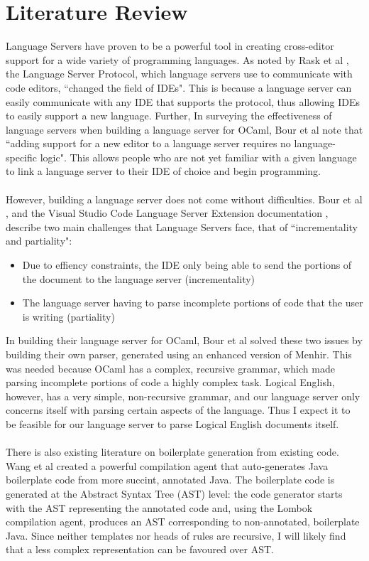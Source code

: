 \documentclass[../main.tex]{subfiles}
\begin{document}
\chapter{Literature Review}
Language Servers have proven to be a powerful tool in creating cross-editor support for a wide variety of programming languages. As noted by Rask et al \cite[]{standardised_lsp_extensions}, the Language Server Protocol, which language servers use to communicate with code editors, ``changed the field of IDEs". This is because a language server can easily communicate with any IDE that supports the protocol, thus allowing IDEs to easily support a new language. Further, In surveying the effectiveness of language servers when building a language server for OCaml, Bour et al \cite[]{merlin_experience_report} note that ``adding support for a new editor to a language server requires no language-specific logic". This allows people who are not yet familiar with a given language to link a language server to their IDE of choice and begin programming. 
\\ \\
However, building a language server does not come without difficulties. Bour et al \cite[]{merlin_experience_report}, and the Visual Studio Code Language Server Extension documentation \cite[]{vsc_langserver_docs}, describe two main challenges that Language Servers face, that of ``incrementality and partiality":
\begin{itemize}
    \item Due to effiency constraints, the IDE only being able to send the portions of the document to the language server (incrementality)
    \item The language server having to parse incomplete portions of code that the user is writing (partiality)
\end{itemize}
In building their language server for OCaml, Bour et al solved these two issues by building their own parser, generated using an enhanced version of Menhir. This was needed because OCaml has a complex, recursive grammar, which made parsing incomplete portions of code a highly complex task. Logical English, however, has a very simple, non-recursive grammar, and our language server only concerns itself with parsing certain aspects of the language. Thus I expect it to be feasible for our language server to parse Logical English documents itself.
\\ \\
There is also existing literature on boilerplate generation from existing code. Wang et al \cite[]{classless_java} created a powerful compilation agent that auto-generates Java boilerplate code from more succint, annotated Java. The boilerplate code is generated at the Abstract Syntax Tree (AST) level: the code generator starts with the AST representing the annotated code and, using the Lombok compilation agent, produces an AST corresponding to non-annotated, boilerplate Java. Since neither templates nor heads of rules are recursive, I will likely find that a less complex representation can be favoured over AST.
\end{document}
